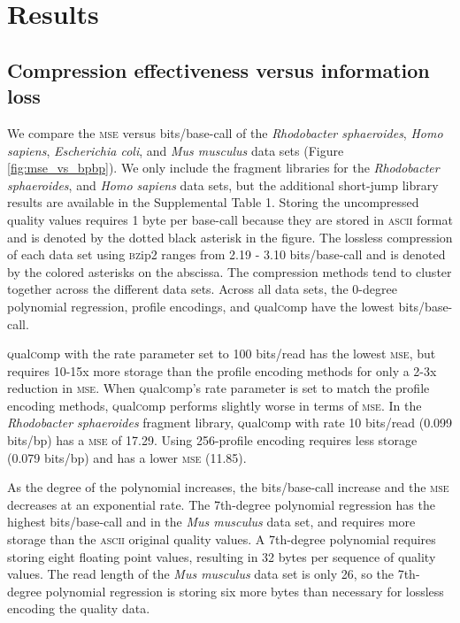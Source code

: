 \documentclass{bioinfo}
\begin{document}
\section{Results}

\subsection{Compression effectiveness versus information loss}

We compare the \textsc{mse} versus bits/base-call of the
\textit{Rhodobacter sphaeroides}, \textit{Homo sapiens},
\textit{Escherichia coli}, and
\textit{Mus musculus} data sets (Figure \ref{fig:mse_vs_bpbp}). We
only include the fragment libraries for the \textit{Rhodobacter
  sphaeroides}, and \textit{Homo sapiens} data
sets, but the additional short-jump library results are available in
the Supplemental Table 1. Storing the uncompressed quality values
requires 1 byte per base-call because they are stored in
\textsc{ascii} format and is denoted by the dotted black asterisk in
the figure. The lossless compression of each data set using
\textsc{bz}ip2 ranges from 2.19 - 3.10 bits/base-call and is denoted
by the colored asterisks on the abscissa. The compression methods tend
to cluster together across the different data sets. Across all data
sets, the 0-degree polynomial regression, profile encodings, and
\textsc{q}ual\textsc{c}omp have the lowest bits/base-call.

\textsc{q}ual\textsc{c}omp with the rate parameter set to 100
bits/read has the lowest \textsc{mse}, but requires 10-15x more
storage than the profile encoding methods for only a 2-3x reduction in
\textsc{mse}. When \textsc{q}ual\textsc{c}omp's rate parameter is set
to match the profile encoding methods, \textsc{q}ual\textsc{c}omp
performs slightly worse in terms of \textsc{mse}. In the
\textit{Rhodobacter sphaeroides} fragment library,
\textsc{q}ual\textsc{c}omp with rate 10 bits/read (0.099 bits/bp) has
a \textsc{mse} of 17.29. Using 256-profile encoding requires less
storage (0.079 bits/bp) and has a lower \textsc{mse} (11.85).

As the degree of the polynomial increases, the bits/base-call increase
and the \textsc{mse} decreases at an exponential rate. The 7th-degree
polynomial regression has the highest bits/base-call and in the
\textit{Mus musculus} data set, and requires more storage than the
\textsc{ascii} original quality values. A 7th-degree polynomial
requires storing eight floating point values, resulting in 32 bytes
per sequence of quality values. The read length of the \textit{Mus
  musculus} data set is only 26, so the 7th-degree polynomial
regression is storing six more bytes than necessary for lossless
encoding the quality data.
\end{document}
